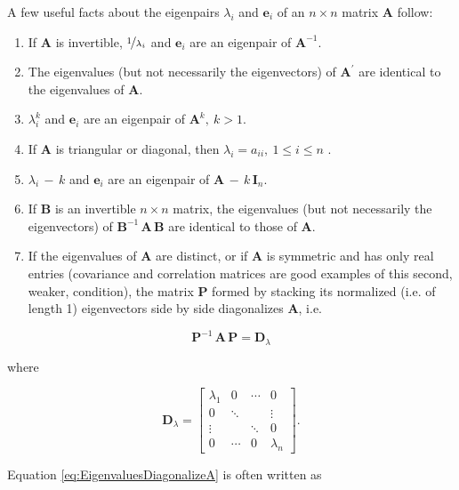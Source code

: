 \documentclass[graybox,envcountchap,sectrefs]{svmono}\usepackage[]{graphicx}\usepackage[]{xcolor}
\begin{document}
\begin{appendices}
A few useful facts about the eigenpairs $\lambda_{i}$ and $\mathrm{\mathbf{e}}_{i}$
of an $n\times n$ matrix $\mathbf{A}$ follow:
\begin{enumerate}
\item If $\mathbf{A}$ is invertible, $\nicefrac{1}{\lambda_{i}}$ and $\mathrm{\mathbf{e}}_{i}$
are an eigenpair of $\mathbf{A}^{-1}.$ 
\item The eigenvalues (but not necessarily the eigenvectors) of $\mathrm{\mathbf{A}^{\prime}}$
are identical to the eigenvalues of $\mathrm{\mathbf{A}}.$
\item $\lambda_{i}^{k}$ and $\mathrm{\mathbf{e}}_{i}$ are an eigenpair
of $\mathbf{A}^{k},\ k>1$.
\item If $\mathbf{A}$ is triangular or diagonal, then $\lambda_{i}=a_{ii},\ 1\leqslant i\leqslant n$
.
\item $\lambda_{i}\,-\,k$ and $\mathrm{\mathbf{e}}_{i}$ are an eigenpair
of $\mathbf{A\,-\,}k\,\mathrm{\mathbf{I}}_{n}$.
\item If $\mathbf{B}$ is an invertible $n\times n$ matrix, the eigenvalues
(but not necessarily the eigenvectors) of $\mathbf{B}^{-1}\,\mathbf{A}\,\mathbf{\mathbf{B}}$
are identical to those of $\mathbf{A}$.
\item If the eigenvalues of $\mathbf{A}$ are distinct, or if $\mathbf{A}$
is symmetric and has only real entries (covariance and correlation
matrices are good examples of this second, weaker, condition), the
matrix $\mathbf{P}$ formed by stacking its normalized (i.e. of length
1) eigenvectors side by side diagonalizes $\mathbf{A}$, i.e.
\end{enumerate}
\begin{equation}
\mathbf{P}^{-1}\,\mathbf{A}\,\mathbf{\mathbf{P}}=\mathbf{D}_{\lambda}\label{eq:EigenvaluesDiagonalizeA}
\end{equation}

where

\begin{equation}
\mathbf{D}_{\lambda}=\left[\begin{array}{cccc}
\lambda_{1} & 0 & \cdots & 0\\
0 & \ddots &  & \vdots\\
\vdots &  & \ddots & 0\\
0 & \cdots & 0 & \lambda_{n}
\end{array}\right].\label{eq:Dlambda}
\end{equation}

Equation \eqref{eq:EigenvaluesDiagonalizeA} is often written as


\end{appendices}
\end{document}
